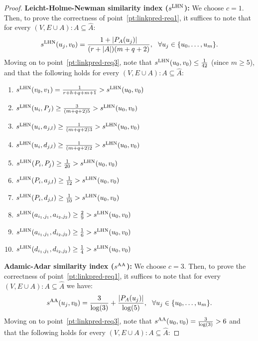 \documentclass[twocolumn]{article}
\newcommand{\FA}{\widehat{A}}
\newcommand{\PA}{P_{A}}
\newcommand{\sLHN}{s^{\text{\normalfont LHN}}}
\newcommand{\sAA}{s^{\text{\normalfont AA}}}
\begin{document}
\begin{proof}
\noindent \textbf{Leicht-Holme-Newman similarity index ($\sLHN$):} We choose $c=1$.
Then, to prove the correctness of point~\ref{pt:linkpred-req1}, it suffices to note that for every $(V,E\cup A):A \subseteq \FA$:
$$
\sLHN(u_j,v_0)=\frac{1+|\PA(u_j)|}{(r+|A|)(m+q+2)},\ \ \forall u_j\in\{u_0,\ldots, u_m\}.
$$
Moving on to point~\ref{pt:linkpred-req3}, note that $\sLHN(u_0,v_0) \leq \frac{1}{42}$ (since $m \geq 5$), and that the following holds for every $(V,E\cup A):A \subseteq \FA$:

\begin{enumerate}[label=(\roman*),leftmargin=*]\itemsep0.4em
\item $\sLHN(v_0,v_1)=\frac{1}{r+h+q+m+1} > \sLHN(u_0,v_0)$
\item $\sLHN(u_i,P_j) \geq \frac{3}{(m+q+2)5} > \sLHN(u_0,v_0)$
\item $\sLHN(u_i,a_{j,l}) \geq \frac{1}{(m+q+2)3} > \sLHN(u_0,v_0)$
\item $\sLHN(u_i,d_{j,l}) \geq \frac{1}{(m+q+2)2} > \sLHN(u_0,v_0)$
\item $\sLHN(P_i,P_j) \geq \frac{1}{20} > \sLHN(u_0,v_0)$
\item $\sLHN(P_i,a_{j,l}) \geq \frac{1}{12} > \sLHN(u_0,v_0)$
\item $\sLHN(P_i,d_{j,l}) \geq \frac{1}{10} > \sLHN(u_0,v_0)$
\item $\sLHN(a_{i_1,j_1},a_{i_2,j_2}) \geq \frac{2}{9} > \sLHN(u_0,v_0)$
\item $\sLHN(a_{i_1,j_1},d_{i_2,j_2}) \geq \frac{1}{6} > \sLHN(u_0,v_0)$
\item $\sLHN(d_{i_1,j_1},d_{i_2,j_2}) \geq \frac{1}{4} > \sLHN(u_0,v_0)$
\end{enumerate}

\noindent \textbf{Adamic-Adar similarity index ($\sAA$):} We choose $c=3$. Then, to prove the correctness of point~\ref{pt:linkpred-req1}, it suffices to note that for every $(V,E\cup A):A \subseteq \FA$ we have: $$
\sAA(u_j,v_0)=\frac{3}{\log(3)}+\frac{|\PA(u_j)|}{\log(5)},\ \ \forall u_j\in\{u_0,\ldots, u_m\}.
$$
Moving on to point~\ref{pt:linkpred-req3}, note that $\sAA(u_0,v_0) = \frac{3}{\log(3)} > 6$ and that the following holds for every $(V,E\cup A):A \subseteq \FA$:


\end{proof}
\end{document}
